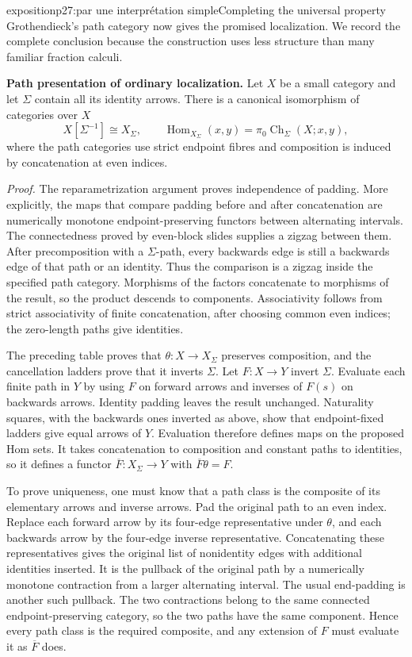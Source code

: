 \begin{dcomment}{exposition}{p27:par une interprétation simple}{Completing the universal property}
Grothendieck's path category now gives the promised localization. We record the complete conclusion because the construction uses less structure than many familiar fraction calculi.

\textbf{Path presentation of ordinary localization.} Let $X$ be a small category and let $\Sigma$ contain all its identity arrows. There is a canonical isomorphism of categories over $X$
\[
 X[\Sigma^{-1}]\cong X_\Sigma,
 \qquad
 \operatorname{Hom}_{X_\Sigma}(x,y)
   =\pi_0\operatorname{Ch}_\Sigma(X;x,y),
\]
where the path categories use strict endpoint fibres and composition is induced by concatenation at even indices.

\emph{Proof.} The reparametrization argument proves independence of padding. More explicitly, the maps that compare padding before and after concatenation are numerically monotone endpoint-preserving functors between alternating intervals. The connectedness proved by even-block slides supplies a zigzag between them. After precomposition with a $\Sigma$-path, every backwards edge is still a backwards edge of that path or an identity. Thus the comparison is a zigzag inside the specified path category. Morphisms of the factors concatenate to morphisms of the result, so the product descends to components. Associativity follows from strict associativity of finite concatenation, after choosing common even indices; the zero-length paths give identities.

The preceding table proves that $\theta:X\to X_\Sigma$ preserves composition, and the cancellation ladders prove that it inverts $\Sigma$. Let $F:X\to Y$ invert $\Sigma$. Evaluate each finite path in $Y$ by using $F$ on forward arrows and inverses of $F(s)$ on backwards arrows. Identity padding leaves the result unchanged. Naturality squares, with the backwards ones inverted as above, show that endpoint-fixed ladders give equal arrows of $Y$. Evaluation therefore defines maps on the proposed Hom sets. It takes concatenation to composition and constant paths to identities, so it defines a functor $\overline F:X_\Sigma\to Y$ with $\overline F\theta=F$.

To prove uniqueness, one must know that a path class is the composite of its elementary arrows and inverse arrows. Pad the original path to an even index. Replace each forward arrow by its four-edge representative under $\theta$, and each backwards arrow by the four-edge inverse representative. Concatenating these representatives gives the original list of nonidentity edges with additional identities inserted. It is the pullback of the original path by a numerically monotone contraction from a larger alternating interval. The usual end-padding is another such pullback. The two contractions belong to the same connected endpoint-preserving category, so the two paths have the same component. Hence every path class is the required composite, and any extension of $F$ must evaluate it as $\overline F$ does.


\end{dcomment}
